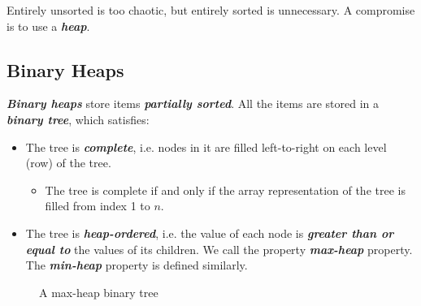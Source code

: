 \documentclass[12pt,a4paper]{ctexart}
\newcommand{\highlight}[1]{\textbf{\textit{#1}}}
\begin{document}
    Entirely unsorted is too chaotic, but entirely sorted is unnecessary. A compromise is to use a \highlight{heap}.

    \subsection{Binary Heaps}

    \highlight{Binary heaps} store items \highlight{partially sorted}. All the items are stored in a \highlight{binary tree}, which satisfies:
    \begin{itemize}
        \item The tree is \highlight{complete}, i.e. nodes in it are filled left-to-right on each level (row) of the tree.
        \begin{itemize}[left=1em]
            \item The tree is complete if and only if the array representation of the tree is filled from index 1 to $n$.
        \end{itemize}
        \item The tree is \highlight{heap-ordered}, i.e. the value of each node is \highlight{greater than or equal to} the values of its children. We call the property \highlight{max-heap} property. The \highlight{min-heap} property is defined similarly.
    \end{itemize}

    \begin{figure}[!htbp]
        \centering
        \caption{A max-heap binary tree}
    \end{figure}
\end{document}
